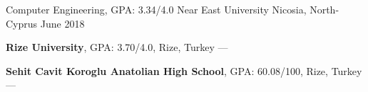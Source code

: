 
\begin{cventries}
  \cventry
    {Computer Engineering, GPA: 3.34/4.0} %
    {Near East University} %
    {Nicosia, North-Cyprus} %
    {June 2018} %
    {
      \begin{cvitems} %
         \item {\textbf{Rize University}, GPA: 3.70/4.0, Rize, Turkey --- }
         \vspace{0.5mm}
         \item {\textbf{Sehit Cavit Koroglu Anatolian High School}, GPA: 60.08/100, Rize, Turkey --- }
      \end{cvitems}
    }
\end{cventries}
